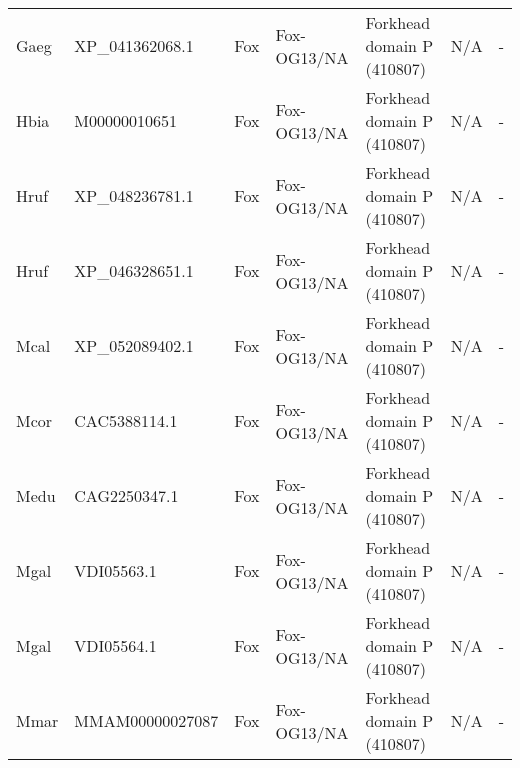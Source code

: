 \documentclass[../main.tex]{subfiles}
\begin{document}
\begin{landscape}
\begin{longtable}{lllllll}
		Gaeg           & XP\_041362068.1       & Fox            & Fox-OG13/NA         & Forkhead domain P (410807)                  & N/A                                                                    & -                    \\
		Hbia           & M00000010651          & Fox            & Fox-OG13/NA         & Forkhead domain P (410807)                  & N/A                                                                    & -                    \\
		Hruf           & XP\_048236781.1       & Fox            & Fox-OG13/NA         & Forkhead domain P (410807)                  & N/A                                                                    & -                    \\
		Hruf           & XP\_046328651.1       & Fox            & Fox-OG13/NA         & Forkhead domain P (410807)                  & N/A                                                                    & -                    \\
		Mcal           & XP\_052089402.1       & Fox            & Fox-OG13/NA         & Forkhead domain P (410807)                  & N/A                                                                    & -                    \\
		Mcor           & CAC5388114.1          & Fox            & Fox-OG13/NA         & Forkhead domain P (410807)                  & N/A                                                                    & -                    \\
		Medu           & CAG2250347.1          & Fox            & Fox-OG13/NA         & Forkhead domain P (410807)                  & N/A                                                                    & -                    \\
		Mgal           & VDI05563.1            & Fox            & Fox-OG13/NA         & Forkhead domain P (410807)                  & N/A                                                                    & -                    \\
		Mgal           & VDI05564.1            & Fox            & Fox-OG13/NA         & Forkhead domain P (410807)                  & N/A                                                                    & -                    \\
		Mmar           & MMAM00000027087       & Fox            & Fox-OG13/NA         & Forkhead domain P (410807)                  & N/A                                                                    & -                    \\

\end{longtable}
\end{landscape}
\end{document}

